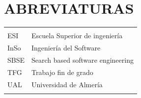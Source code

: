 

\rmfamily
\setcounter{secnumdepth}{3} %
\setcounter{tocdepth}{3} %



\tableofcontents
\listoffigures %
\listoftables %
\lstlistoflistings %





\clearpage
\vspace{0.2cm}
\section*{ABREVIATURAS}

\begin{tabular}{ l   |    l  }

&\\
   ESI & Escuela Superior de ingeniería \\
   InSo & Ingeniería del Software \\
    SBSE& Search based software engineering\\
   TFG & Trabajo fin de grado\\
   
      UAL & Universidad de Almería \\
      &\\

\end{tabular}




